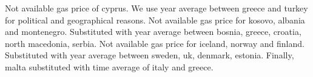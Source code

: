 \documentclass[
]{article}
\newenvironment{Shaded}{\begin{snugshade}}{\end{snugshade}}
\newcommand{\ControlFlowTok}[1]{\textcolor[rgb]{0.13,0.29,0.53}{\textbf{#1}}}
\newcommand{\DataTypeTok}[1]{\textcolor[rgb]{0.13,0.29,0.53}{#1}}
\newcommand{\DecValTok}[1]{\textcolor[rgb]{0.00,0.00,0.81}{#1}}
\newcommand{\KeywordTok}[1]{\textcolor[rgb]{0.13,0.29,0.53}{\textbf{#1}}}
\newcommand{\NormalTok}[1]{#1}
\newcommand{\OperatorTok}[1]{\textcolor[rgb]{0.81,0.36,0.00}{\textbf{#1}}}
\newcommand{\StringTok}[1]{\textcolor[rgb]{0.31,0.60,0.02}{#1}}
\begin{document}
Not available gas price of cyprus. We use year average between greece
and turkey for political and geographical reasons. Not available gas
price for kosovo, albania and montenegro. Substituted with year average
between bosnia, greece, croatia, north macedonia, serbia. Not available
gas price for iceland, norway and finland. Substituted with year average
between sweden, uk, denmark, estonia. Finally, malta substituted with
time average of italy and greece.

\begin{Shaded}
\end{Shaded}
\end{document}
